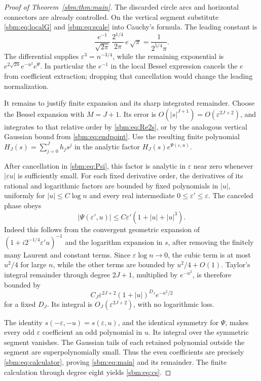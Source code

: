 \documentclass[11pt,letterpaper]{article}
\numberwithin{equation}{section}
\theoremstyle{remark}\newtheorem{remark}[theorem]{Remark}
\begin{document}
\begin{proof}[Proof of Theorem~\ref{sbm:thm:main}]
The discarded circle arcs and horizontal connectors are already
controlled. On the vertical segment substitute \eqref{sbm:eq:localG} and
\eqref{sbm:eq:scale} into Cauchy's formula. The leading constant is
\[
 \frac{e^{-1}}{\sqrt{2\pi}}\,
 \frac{2^{1/4}}{2\pi}\,e\,\sqrt\pi
       =\frac1{2^{5/4}\pi}.
\]
The differential supplies $\varepsilon^3=n^{-3/4}$, while the
remaining exponential is $e^{2\sqrt{2n}}e^{-u^2}e^\Psi$.
In particular the $e^{-1}$ in the local Bessel expression cancels
the $e$ from coefficient extraction; dropping that cancellation
would change the leading normalization.

It remains to justify finite expansion and its sharp integrated
remainder. Choose the Bessel expansion with $M=J+1$. Its error is
$O(|s|^{J+1})=O(\varepsilon^{2J+2})$, and integrates to that relative
order by \eqref{sbm:eq:Re2s}, or by the analogous vertical Gaussian bound
from \eqref{sbm:eq:endpoint}. Use the resulting finite polynomial
$H_J(s)=\sum_{j=0}^Jh_js^j$ in the analytic factor
$H_J(s)e^{\Psi(\varepsilon,u)}$.

After cancellation in \eqref{sbm:eq:Psi}, this factor is analytic in
$\varepsilon$ near zero whenever $|\varepsilon u|$ is sufficiently
small. For each fixed derivative order, the derivatives of its
rational and logarithmic factors are bounded by fixed polynomials
in $|u|$, uniformly for $|u|\leq C\log n$ and every real intermediate
$0\leq\varepsilon'\leq\varepsilon$. The canceled phase obeys
\[
 |\Psi(\varepsilon',u)|
       \leq C\varepsilon'(1+|u|+|u|^3).
\]
Indeed this follows from the convergent geometric expansion of
$(1+i2^{-1/4}\varepsilon' u)^{-1}$ and the logarithm expansion in
$s$, after removing the finitely many Laurent and constant terms.
Since $\varepsilon\log n\to0$, the cubic term is at most $u^2/4$
for large $n$, while the other terms are bounded by $u^2/4+O(1)$.
Taylor's integral remainder through degree $2J+1$, multiplied by
$e^{-u^2}$, is therefore bounded by
\begin{equation}\label{sbm:eq:gaussian-rem}
 C_J\varepsilon^{2J+2}(1+|u|)^{D_J}e^{-u^2/2}
\end{equation}
for a fixed $D_J$. Its integral is $O_J(\varepsilon^{2J+2})$,
with no logarithmic loss.

The identity $s(-\varepsilon,-u)=s(\varepsilon,u)$, and the identical
symmetry for $\Psi$, makes every odd $\varepsilon$ coefficient an odd
polynomial in $u$. Its integral over the symmetric segment vanishes.
The Gaussian tails of each retained polynomial outside the segment
are superpolynomially small. Thus the even coefficients are precisely
\eqref{sbm:eq:calculator}, proving \eqref{sbm:eq:main} and its remainder.
The finite calculation through degree eight yields \eqref{sbm:eq:cs}.
\end{proof}
\end{document}
